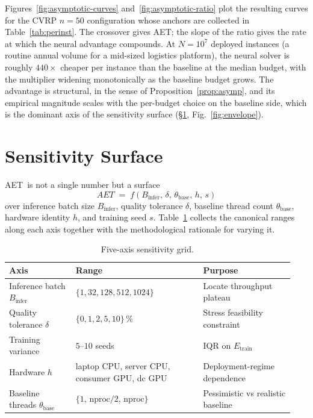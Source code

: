 \documentclass[11pt]{article}
\newcommand{\AET}{AET}
\begin{document}
Figures~\ref{fig:asymptotic-curves} and~\ref{fig:asymptotic-ratio} plot the resulting curves for the CVRP \(n{=}50\) configuration whose anchors are collected in Table~\ref{tab:perinst}. The crossover gives \AET; the slope of the ratio gives the rate at which the neural advantage compounds. At \(N = 10^{7}\) deployed instances (a routine annual volume for a mid-sized logistics platform), the neural solver is roughly \(440\times\) cheaper per instance than the baseline at the median budget, with the multiplier widening monotonically as the baseline budget grows. The advantage is structural, in the sense of Proposition~\ref{prop:asymp}, and its empirical magnitude scales with the per-budget choice on the baseline side, which is the dominant axis of the sensitivity surface (\S\ref{sec:sensitivity}, Fig.~\ref{fig:envelope}).

\section{Sensitivity Surface}
\label{sec:sensitivity}

\AET\ is not a single number but a surface
\[
  \AET \;=\; f(B_\text{infer},\, \delta,\, \theta_\text{base},\, h,\, s)
\]
over inference batch size \(B_\text{infer}\), quality tolerance \(\delta\), baseline thread count \(\theta_\text{base}\), hardware identity \(h\), and training seed \(s\). Table~\ref{tab:sensitivity} collects the canonical ranges along each axis together with the methodological rationale for varying it.

\begin{table}[!htbp]
\centering \small \setlength{\tabcolsep}{4pt}
\begin{tabular}{@{}p{0.22\linewidth} p{0.42\linewidth} p{0.30\linewidth}@{}}
\toprule
\textbf{Axis} & \textbf{Range} & \textbf{Purpose} \\
\midrule
Inference batch \(B_\text{infer}\)
  & \(\{1, 32, 128, 512, 1024\}\)
  & Locate throughput plateau \\
Quality tolerance \(\delta\)
  & \(\{0, 1, 2, 5, 10\}\,\%\)
  & Stress feasibility constraint \\
Training variance
  & \(5\)--\(10\) seeds
  & IQR on \(E_\text{train}\) \\
Hardware \(h\)
  & laptop CPU, server CPU, consumer GPU, dc GPU
  & Deployment-regime dependence \\
Baseline threads \(\theta_\text{base}\)
  & \(\{1,\,\mathrm{nproc}/2,\,\mathrm{nproc}\}\)
  & Pessimistic vs realistic baseline \\
\bottomrule
\end{tabular}
\caption{Five-axis sensitivity grid.}
\label{tab:sensitivity}
\end{table}
\end{document}
